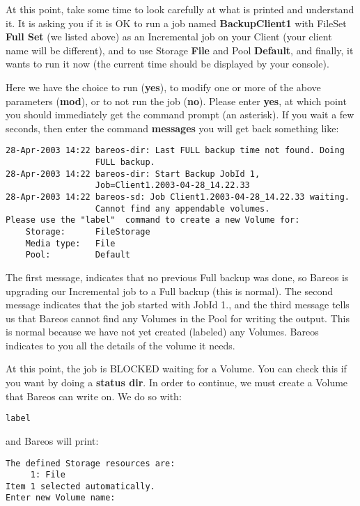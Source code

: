 At this point, take some time to look carefully at what is printed and
understand it. It is asking you if it is OK to run a job named {\bf BackupClient1}
with FileSet {\bf Full Set} (we listed above) as an Incremental job on your
Client (your client name will be different), and to use Storage {\bf File} and
Pool {\bf Default}, and finally, it wants to run it now (the current time
should be displayed by your console).

Here we have the choice to run ({\bf yes}), to modify one or more of the above
parameters ({\bf mod}), or to not run the job ({\bf no}). Please enter {\bf
yes}, at which point you should immediately get the command prompt (an
asterisk). If you wait a few seconds, then enter the command {\bf messages}
you will get back something like:


\footnotesize
\begin{verbatim}
28-Apr-2003 14:22 bareos-dir: Last FULL backup time not found. Doing
                  FULL backup.
28-Apr-2003 14:22 bareos-dir: Start Backup JobId 1,
                  Job=Client1.2003-04-28_14.22.33
28-Apr-2003 14:22 bareos-sd: Job Client1.2003-04-28_14.22.33 waiting.
                  Cannot find any appendable volumes.
Please use the "label"  command to create a new Volume for:
    Storage:      FileStorage
    Media type:   File
    Pool:         Default
\end{verbatim}
\normalsize

The first message, indicates that no previous Full backup was done, so Bareos
is upgrading our Incremental job to a Full backup (this is normal). The second
message indicates that the job started with JobId 1., and the third message
tells us that Bareos cannot find any Volumes in the Pool for writing the
output. This is normal because we have not yet created (labeled) any Volumes.
Bareos indicates to you all the details of the volume it needs.

At this point, the job is BLOCKED waiting for a Volume. You can check this if
you want by doing a {\bf status dir}. In order to continue, we must create a
Volume that Bareos can write on. We do so with:

\footnotesize
\begin{verbatim}
label
\end{verbatim}
\normalsize

and Bareos will print:

\footnotesize
\begin{verbatim}
The defined Storage resources are:
     1: File
Item 1 selected automatically.
Enter new Volume name:
\end{verbatim}
\normalsize


